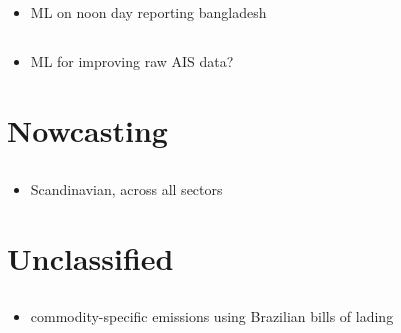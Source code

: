 \documentclass{article}
\newcommand{\paperpath}{../resources/}
\newcommand{\myhref}[2]{\href{run:\paperpath#1}{#2}}
\begin{document}
\subsection{\myhref{Monisha et al 2023 - A STEP TOWARDS IMO GREENHOUSE GAS REDUCTION GOAL.pdf}{\textcite{monisha2023step}}}
\begin{itemize}
    \item ML on noon day reporting bangladesh
\end{itemize}
\subsection{\myhref{Yang et al 2024 - Harnessing the power of Machine learning for AIS Data-Driven.pdf}{\textcite{yang2024harnessing}}}
\begin{itemize}
    \item ML for improving raw AIS data?
\end{itemize}

\section{Nowcasting}
\subsection{\href{https://play.google.com/books/reader?id=gHOVEAAAQBAJ&pg=GBS.PA2&hl=en}{\textcite{pandis2022nowcasting}}}
\begin{itemize}
    \item Scandinavian, across all sectors
\end{itemize}
\subsection{\myhref{IMF Arslanalp et al 2019 - Big Data on Vessel Traffic.pdf}{\textcite{arslanalp2019big}}}
\subsection{\myhref{IMF Cerdeiro 2020 - World Seaborne Trade in Real Time.pdf}{\textcite{cerdeiro2020world}}}

\section{Unclassified}

\subsection{\myhref{van der Loeff et al 2018 - A spatially explicit data-driven approach to calculating commodity-specific shipping emissions per vessel}{\textcite{van2018spatially}}}
\begin{itemize}
    \item commodity-specific emissions using Brazilian bills of lading
\end{itemize}
\end{document}
